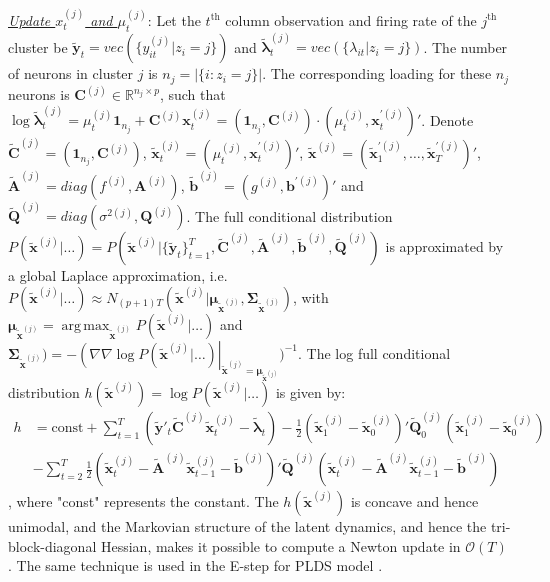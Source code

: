 \documentclass{article}
\DeclareMathOperator*{\argmax}{arg\,max}
\begin{document}
	\underline{\textit{Update $x_t^{(j)}$ and $\mu_t^{(j)}$}}:
	Let the $t^{\text{th}}$ column observation and firing rate of the $j^{\text{th}}$ cluster be $\widetilde{\bm{y}}_t = vec\left(\{y_{it}^{(j)}|z_i = j\}\right)$ and $\widetilde{\bm{\lambda}}_t^{(j)} = vec\left(\{\lambda_{it}|z_i = j\}\right)$. The number of neurons in cluster $j$ is $n_j=\left|\{i:z_i = j\}\right|$. The corresponding loading for these $n_j$ neurons is $\bm{C}^{(j)}\in\mathbb{R}^{n_j\times p}$, such that $\log \widetilde{\bm{\lambda}}_t^{(j)} = \mu_t^{(j)}\bm{1}_{n_j} + \bm{C}^{(j)}\bm{x}_t^{(j)} = \left(\bm{1}_{n_j}, \bm{C}^{(j)} \right)\cdot \left(\mu_t^{(j)}, \bm{x}_t^{'(j)}\right)'$. Denote $\bm{\widetilde{C}}^{(j)} = \left(\bm{1}_{n_j}, \bm{C}^{(j)} \right)$, $\bm{\widetilde{x}}_t^{(j)} = \left(\mu_t^{(j)}, \bm{x}_t^{'(j)}\right)'$, $\bm{\widetilde{x}}^{(j)} = \left(\bm{\widetilde{x}}_1^{'(j)},\ldots,\bm{\widetilde{x}}_T^{'(j)}\right)'$, $\widetilde{\bm{A}}^{(j)} = diag(f^{(j)}, \bm{A}^{(j)})$, $\widetilde{\bm{b}}^{(j)} = \left(g^{(j)}, \bm{b}^{'(j)}\right)'$ and $\widetilde{\bm{Q}}^{(j)} = diag(\sigma^{2(j)}, \bm{Q}^{(j)})$. The full conditional distribution $P(\bm{\widetilde{x}}^{(j)}|\ldots) = P(\bm{\widetilde{x}}^{(j)}|\{\widetilde{\bm{y}}_t\}_{t=1}^T, \bm{\widetilde{C}}^{(j)}, \widetilde{\bm{A}}^{(j)}, \widetilde{\bm{b}}^{(j)}, \widetilde{\bm{Q}}^{(j)})$ is approximated by a global Laplace approximation, i.e. $P(\bm{\widetilde{x}}^{(j)}|\ldots) \approx  N_{(p+1)T}(\bm{\widetilde{x}}^{(j)} | \bm{\mu}_{\widetilde{\bm{x}}^{(j)}}, \bm{\Sigma}_{\widetilde{\bm{x}}^{(j)}})$, with $\bm{\mu}_{\widetilde{\bm{x}}^{(j)}} = \argmax_{\widetilde{\bm{x}}^{(j)}}P(\bm{\widetilde{x}}^{(j)}|\ldots)$ and $\bm{\Sigma}_{\widetilde{\bm{x}}^{(j)}}) = -\left(\nabla\nabla \log P(\bm{\widetilde{x}}^{(j)}|\ldots)\right |_{\bm{\widetilde{x}}^{(j)} = \bm{\mu}_{\widetilde{\bm{x}}^{(j)}}} )^{-1}$. The log full conditional distribution $h(\bm{\widetilde{x}}^{(j)}) = \log P(\bm{\widetilde{x}}^{(j)}|\ldots)$ is given by:
	\begin{align*}
		h &= \text{const} + \sum_{t=1}^{T} \left(\widetilde{\bm{y}}'_t\bm{\widetilde{C}}^{(j)}\bm{\widetilde{x}}_t^{(j)} - \widetilde{\bm{\lambda}}_t\right)
		- \frac{1}{2}(\bm{\widetilde{x}}_1^{(j)}  - \bm{\widetilde{x}}_0^{(j)})'\bm{\widetilde{\bm{Q}}}^{(j)}_0(\bm{\widetilde{x}}_1^{(j)}  - \bm{\widetilde{x}}_0^{(j)})\\ 
		&-\sum_{t=2}^{T}\frac{1}{2}(\bm{\widetilde{x}}_t^{(j)}  - \widetilde{\bm{A}}^{(j)}\bm{\widetilde{x}}_{t-1}^{(j)} - \widetilde{\bm{b}}^{(j)})'\bm{\widetilde{\bm{Q}}}^{(j)}(\bm{\widetilde{x}}_t^{(j)}  - \widetilde{\bm{A}}^{(j)}\bm{\widetilde{x}}_{t-1}^{(j)} - \widetilde{\bm{b}}^{(j)})
	\end{align*}
	, where "const" represents the constant. The $h(\bm{\widetilde{x}}^{(j)})$ is concave and hence unimodal, and the Markovian structure of the latent dynamics, and hence the tri-block-diagonal Hessian, makes it possible to compute a Newton update in $\mathcal{O}(T)$ \citep{Paninski2010}. The same technique is used in the E-step for PLDS model \citep{Macke2011}.
	
\end{document}
